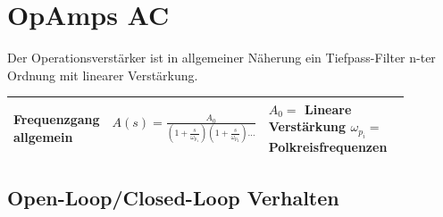 
\section{OpAmps AC}

Der Operationsverstärker ist in allgemeiner Näherung ein Tiefpass-Filter n-ter Ordnung mit linearer Verstärkung.

 \begin{tabular}{|p{0.15\linewidth}|p{0.28\linewidth}|p{0.445\linewidth}|}
 	\hline
 	Frequenzgang allgemein
 		& \large{$A(s) = \frac{A_{0}}{(1+\frac{s}{\omega_{p_1}})(1+\frac{s}{\omega_{p_2}})\dots}$}
 		& $A_{0}=$ Lineare Verstärkung \newline $\omega_{p_i}=$ Polkreisfrequenzen \\
 	\hline
 \end{tabular}
 
\subsection{Open-Loop/Closed-Loop Verhalten}


